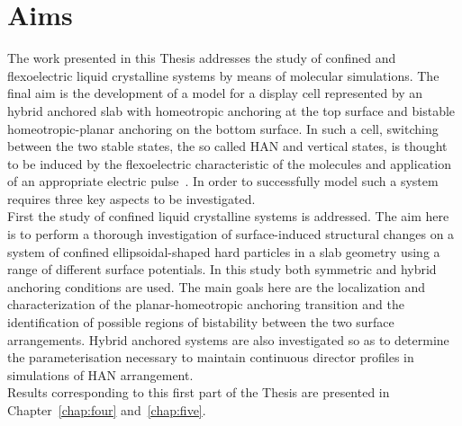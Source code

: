 

\section{Aims}


The work presented in this Thesis addresses the study of confined and flexoelectric liquid
crystalline systems by means of molecular simulations. The final aim is the development of
a model for a display cell represented by an hybrid anchored slab with homeotropic anchoring
at the top surface and bistable homeotropic-planar anchoring on the bottom surface. In such
a cell, switching between the two stable states, the so called HAN and vertical states, is
thought to be induced by the flexoelectric characteristic of the molecules and application 
of an appropriate electric pulse~\cite{DavidsonMottram02}. In order to successfully model 
such a system requires three key aspects to be investigated.\\

First the study of confined liquid crystalline systems is addressed. The aim here is to perform a
thorough investigation of surface-induced structural changes on a system of confined
ellipsoidal-shaped hard particles in a slab geometry using a range of
different surface potentials. In this study both symmetric and hybrid anchoring conditions are
used. The main goals here are the localization and characterization of the planar-homeotropic
anchoring transition and the identification of possible regions of bistability between the two
surface arrangements. Hybrid anchored systems are also investigated so as to determine the
parameterisation necessary to maintain continuous director profiles in simulations of HAN 
arrangement.\\
%
Results corresponding to this first part of the Thesis are presented in
Chapter~\ref{chap:four} and~\ref{chap:five}.\\



